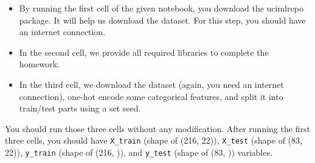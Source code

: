 \documentclass[a3paper,12pt]{extarticle} %
\begin{document}
\begin{itemize}
    \item By running the first cell of the given notebook, you download the ucimlrepo package. It will help us download the dataset. For this step, you should have an internet connection.
    \item In the second cell, we provide all required libraries to complete the homework.
    \item In the third cell, we download the dataset (again, you need an internet connection), one-hot encode some categorical features, and split it into train/test parts using a set seed.
\end{itemize}

You should run those three cells without any modification. After running the first three cells, you should have \texttt{X\_train} (shape of (216, 22)), \texttt{X\_test} (shape of (83, 22)), \texttt{y\_train} (shape of (216, )), and \texttt{y\_test} (shape of (83, )) variables.
\end{document}

